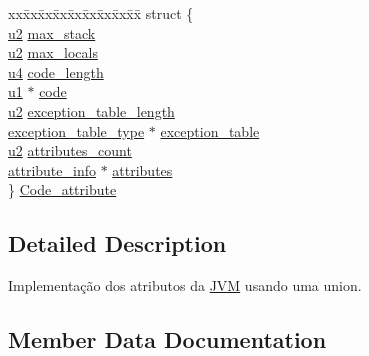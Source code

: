 \begin{DoxyCompactItemize}
\begin{tabbing}
\end{tabbing}\item 
\begin{tabbing}
xx\=xx\=xx\=xx\=xx\=xx\=xx\=xx\=xx\=\kill
struct \{\\
\>\hyperlink{structures_8h_a55ef8d87fd202b8417704c089899c5b9}{u2} \hyperlink{unionattribute__types_a8aef12d8fa3206bf9e5a4ffba0f27c43}{max\_stack}\\
\>\hyperlink{structures_8h_a55ef8d87fd202b8417704c089899c5b9}{u2} \hyperlink{unionattribute__types_a43257bb8c61a610246f334abc8776d3f}{max\_locals}\\
\>\hyperlink{structures_8h_ae391a1d79bb0c8cbc283f0283e3c098b}{u4} \hyperlink{unionattribute__types_a6b6b493d963093474ba6c55a19abb6e4}{code\_length}\\
\>\hyperlink{structures_8h_a64f8055b64cf2a4c299c841130c5c938}{u1} $\ast$ \hyperlink{unionattribute__types_a95ba29f957b7294764f797a396bed627}{code}\\
\>\hyperlink{structures_8h_a55ef8d87fd202b8417704c089899c5b9}{u2} \hyperlink{unionattribute__types_a057d74055d4fa64d0f5c93ede3b4e97f}{exception\_table\_length}\\
\>\hyperlink{structexception__table__type}{exception\_table\_type} $\ast$ \hyperlink{unionattribute__types_af61d8e6486ae314ba9bfc0f791bf7032}{exception\_table}\\
\>\hyperlink{structures_8h_a55ef8d87fd202b8417704c089899c5b9}{u2} \hyperlink{unionattribute__types_a9ef9c49c6e838abafc0e88a7969862a4}{attributes\_count}\\
\>\hyperlink{structattribute__info}{attribute\_info} $\ast$ \hyperlink{unionattribute__types_a1c56d2a7a4234ee27f831a0a81550ccb}{attributes}\\
\} \hyperlink{unionattribute__types_a4d78dcb1862f185b0d2eff1ce96aec71}{Code\_attribute}\\

\end{tabbing}\end{DoxyCompactItemize}


\subsection{Detailed Description}
Implementação dos atributos da \hyperlink{structJVM}{J\+VM} usando uma union. 

\subsection{Member Data Documentation}
